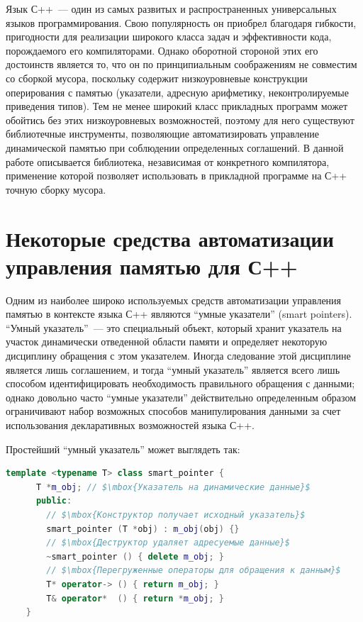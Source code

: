 Язык С++~--- один из самых развитых и распространенных универсальных языков программирования. Свою популярность он приобрел 
благодаря гибкости, пригодности для реализации широкого класса задач и эффективности кода, порождаемого его 
компиляторами. Однако оборотной стороной этих его достоинств является то, что он по принципиальным соображениям не 
совместим со сборкой мусора, поскольку содержит низкоуровневые конструкции оперирования с памятью (указатели, адресную 
арифметику, неконтролируемые приведения типов). Тем не менее широкий класс прикладных программ может обойтись без этих
низкоуровневых возможностей, поэтому для него существуют библиотечные инструменты, позволяющие автоматизировать
управление динамической памятью при соблюдении определенных соглашений. В данной работе описывается
библиотека, независимая от конкретного компилятора, применение которой позволяет использовать в прикладной
программе на С++ точную сборку мусора.
\section{Некоторые средства автоматизации\\
управления памятью для С++}

Одним из наиболее широко используемых средств автоматизации управления памятью в
контексте языка С++ являются ``умные указатели'' (smart pointers). ``Умный указатель''~---
это специальный объект, который хранит указатель на участок динамически отведенной области
памяти и определяет некоторую дисциплину обращения с этом указателем. Иногда следование
этой дисциплине является лишь соглашением, и тогда ``умный указатель'' является всего лишь
способом идентифицировать необходимость правильного обращения с данными; однако довольно часто
``умные указатели'' действительно определенным образом ограничивают набор возможных
способов манипулирования данными за счет использования декларативных возможностей языка С++.

Простейший ``умный указатель'' может выглядеть так:

\begin{lstlisting}[language=C++,mathescape=true]
    template <typename T> class smart_pointer {
      T *m_obj; // $\mbox{Указатель на динамические данные}$
      public:
        // $\mbox{Конструктор получает исходный указатель}$
        smart_pointer (T *obj) : m_obj(obj) {}
        // $\mbox{Деструктор удаляет адресуемые данные}$
        ~smart_pointer () { delete m_obj; }
        // $\mbox{Перегруженные операторы для обращения к данным}$
        T* operator-> () { return m_obj; }
        T& operator*  () { return *m_obj; }
    }
\end{lstlisting}

